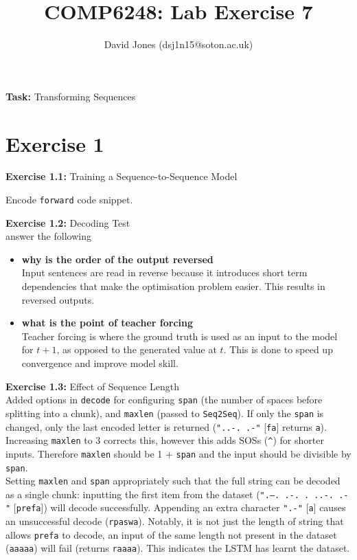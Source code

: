 \documentclass[11pt,a4paper]{article}
\title{COMP6248: Lab Exercise 7}
\author{
David Jones (dsj1n15@soton.ac.uk)}
\date{}
\begin{document}
\maketitle
\textbf{Task:} Transforming Sequences
\vspace{-0.5em}
\section{Exercise 1}

\textbf{Exercise 1.1:} Training a Sequence-to-Sequence Model
\begin{listing}[H]
    \caption{Encode \texttt{forward} code snippet.}
    \label{lst:encode_snippet}
    \end{listing}

\noindent\textbf{Exercise 1.2:} Decoding Test
\vspace{0.5em}\\
answer the following
\begin{itemize}
    \item \textbf{why is the order of the output reversed}\\Input sentences are read in reverse because it introduces short term dependencies that make the optimisation problem easier. This results in reversed outputs.
    \item \textbf{what is the point of teacher forcing}\\Teacher forcing is where the ground truth is used as an input to the model for $t + 1$, as opposed to the generated value at $t$. This is done to speed up convergence and improve model skill.
\end{itemize}


\noindent\textbf{Exercise 1.3:} Effect of Sequence Length
\vspace{0.5em}\\
Added options in \texttt{decode} for configuring \texttt{span} (the number of spaces before splitting into a chunk), and \texttt{maxlen} (passed to \texttt{Seq2Seq}). If only the \texttt{span} is changed, only the last encoded letter is returned (\texttt{"..-. .-"} [\texttt{fa}] returns \texttt{a}). Increasing \texttt{maxlen} to 3 corrects this, however this adds SOSs (\texttt{\^}) for shorter inputs. Therefore \texttt{maxlen} should be 1 + \texttt{span} and the input should be divisible by \texttt{span}.\\

\noindent Setting \texttt{maxlen} and \texttt{span} appropriately such that the full string can be decoded as a single chunk: inputting the first item from the dataset (\texttt{".--. .-. . ..-. .-"} [\texttt{prefa}]) will decode successfully. Appending an extra character \texttt{".-"} [\texttt{a}] causes an unsuccessful decode (\texttt{rpaswa}). Notably, it is not just the length of string that allows \texttt{prefa} to decode, an input of the same length not present in the dataset (\texttt{aaaaa}) will fail (returns \texttt{raaaa}). This indicates the LSTM has learnt the dataset.
\end{document}
